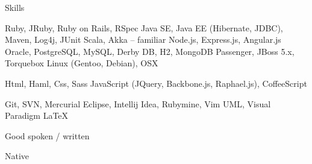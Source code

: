 \begin{rubric}{Skills}

\entry*
  Ruby, JRuby, Ruby on Rails, RSpec
\entry*
  Java SE, Java EE (Hibernate, JDBC), Maven, Log4j, JUnit
\entry*
  Scala, Akka – familiar
\entry*
  Node.js, Express.js, Angular.js
\entry*
  Oracle, PostgreSQL, MySQL, Derby DB, H2, MongoDB
\entry*
  Passenger, JBoss 5.x, Torquebox
\entry*
  Linux (Gentoo, Debian), OSX

\entry*
  Html, Haml, Css, Sass
\entry*
  JavaScript (JQuery, Backbone.js, Raphael.js), CoffeeScript

\entry*
  Git, SVN, Mercurial
\entry*  
  Eclipse, Intellij Idea, Rubymine, Vim
\entry*
  UML, Visual Paradigm
\entry*
  LaTeX


\entry*[English:]
  Good spoken / written

\entry*[Polish:]
  Native

\end{rubric}
